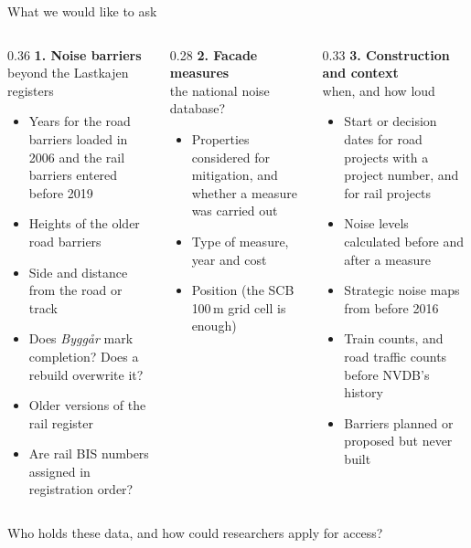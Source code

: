 \documentclass[aspectratio=169, 10pt]{beamer}
\newcommand{\muted}[1]{{\color{black!55}#1}}
\begin{document}
\begin{frame}{What we would like to ask}
\footnotesize
\begin{columns}[T]
\begin{column}{0.36\textwidth}
\textbf{\color{mDarkTeal}1. Noise barriers}\\[0.2em]
\muted{beyond the Lastkajen registers}
\begin{itemize}\setlength{\itemsep}{0pt}
  \item Years for the road barriers loaded in 2006 and the rail barriers entered before 2019
  \item Heights of the older road barriers
  \item Side and distance from the road or track
  \item Does \textit{Byggår} mark completion? Does a rebuild overwrite it?
  \item Older versions of the rail register
  \item Are rail BIS numbers assigned in registration order?
\end{itemize}
\end{column}
\begin{column}{0.28\textwidth}
\textbf{\color{mDarkTeal}2. Facade measures}\\[0.2em]
\muted{the national noise database?}
\begin{itemize}\setlength{\itemsep}{0pt}
  \item Properties considered for mitigation, and whether a measure was carried out
  \item Type of measure, year and cost
  \item Position (the SCB 100\,m grid cell is enough)
\end{itemize}
\end{column}
\begin{column}{0.33\textwidth}
\textbf{\color{mDarkTeal}3. Construction and context}\\[0.2em]
\muted{when, and how loud}
\begin{itemize}\setlength{\itemsep}{0pt}
  \item Start or decision dates for road projects with a project number, and for rail projects
  \item Noise levels calculated before and after a measure
  \item Strategic noise maps from before 2016
  \item Train counts, and road traffic counts before NVDB's history
  \item Barriers planned or proposed but never built
\end{itemize}
\end{column}
\end{columns}

\medskip
\centering
\small Who holds these data, and how could researchers apply for access?
\end{frame}
\end{document}
